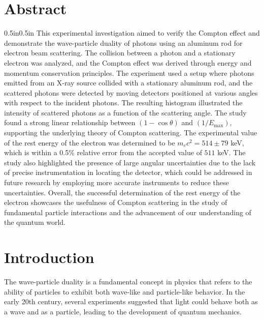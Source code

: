 \newpage
\section*{Abstract}

\begin{adjustwidth}{0.5in}{0.5in}
	This experimental investigation aimed to verify the Compton effect and demonstrate the wave-particle duality of photons using an aluminum rod for electron beam scattering. The collision between a photon and a stationary electron was analyzed, and the Compton effect was derived through energy and momentum conservation principles. The experiment used a setup where photons emitted from an X-ray source collided with a stationary aluminum rod, and the scattered photons were detected by moving detectors positioned at various angles with respect to the incident photons. The resulting histogram illustrated the intensity of scattered photons as a function of the scattering angle. The study found a strong linear relationship between $(1-\cos\theta)$ and $(1/E_{\max})$, supporting the underlying theory of Compton scattering. The experimental value of the rest energy of the electron was determined to be $m_ec^2 = 514 \pm 79$ keV, which is within a 0.5\% relative error from the accepted value of $511$ keV. The study also highlighted the presence of large angular uncertainties due to the lack of precise instrumentation in locating the detector, which could be addressed in future research by employing more accurate instruments to reduce these uncertainties. Overall, the successful determination of the rest energy of the electron showcases the usefulness of Compton scattering in the study of fundamental particle interactions and the advancement of our understanding of the quantum world.
\end{adjustwidth}

\section{Introduction}
The wave-particle duality is a fundamental concept in physics that refers to the ability of particles to exhibit both wave-like and particle-like behavior. In the early 20th century, several experiments suggested that light could behave both as a wave and as a particle, leading to the development of quantum mechanics.

